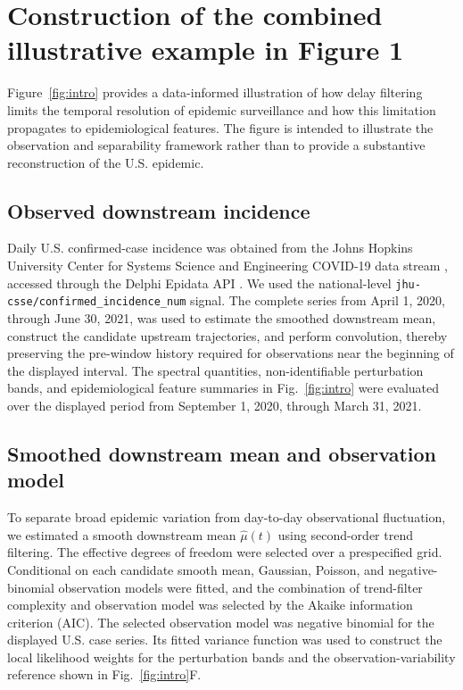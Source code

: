 \renewcommand{\thesection}{S\arabic{section}}
\setcounter{section}{1}

\section{Construction of the combined illustrative example in Figure 1}
\label{sec:Appendix_S2}

Figure~\ref{fig:intro} provides a data-informed illustration of how delay filtering limits the temporal resolution of epidemic surveillance and how this limitation propagates to epidemiological features. The figure is intended to illustrate the observation and separability framework rather than to provide a substantive reconstruction of the U.S. epidemic.

\subsection{Observed downstream incidence}

Daily U.S. confirmed-case incidence was obtained from the Johns Hopkins University Center for Systems Science and Engineering COVID-19 data stream \cite{dong2020interactive}, accessed through the Delphi Epidata API \cite{farrow2015delphi}. We used the national-level \texttt{jhu-csse/confirmed\_incidence\_num} signal. The complete series from April 1, 2020, through June 30, 2021, was used to estimate the smoothed downstream mean, construct the candidate upstream trajectories, and perform convolution, thereby preserving the pre-window history required for observations near the beginning of the displayed interval. The spectral quantities, non-identifiable perturbation bands, and epidemiological feature summaries in Fig.~\ref{fig:intro} were evaluated over the displayed period from September 1, 2020, through March 31, 2021.

\subsection{Smoothed downstream mean and observation model}

To separate broad epidemic variation from day-to-day observational fluctuation, we estimated a smooth downstream mean \(\widehat{\mu}(t)\) using second-order trend filtering. The effective degrees of freedom were selected over a prespecified grid. Conditional on each candidate smooth mean, Gaussian, Poisson, and negative-binomial observation models were fitted, and the combination of trend-filter complexity and observation model was selected by the Akaike information criterion (AIC). The selected observation model was negative binomial for the displayed U.S. case series. Its fitted variance function was used to construct the local likelihood weights for the perturbation bands and the observation-variability reference shown in Fig.~\ref{fig:intro}F.

